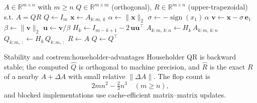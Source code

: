 \begin{algorithm}[H]
  \caption{QR Decomposition via Householder Reflections (full \(Q\))}
  \begin{algorithmic}[1]
    \Require $A \in \mathbb{R}^{m \times n}$ with $m \ge n$
    \Ensure $Q \in \mathbb{R}^{m \times m}$ (orthogonal), $R \in \mathbb{R}^{m \times n}$ (upper-trapezoidal) s.t. $A = QR$
    \State $Q \gets I_m$
      \State $\mathbf{x} \gets A_{k:m,\,k}$
        \State $\alpha \gets \|\mathbf{x}\|_2$
        \State $\sigma \gets -\operatorname{sign}(x_1)\,\alpha$ 
        \State $\mathbf{v} \gets \mathbf{x} - \sigma\,\mathbf{e}_1$
        \State $\beta \gets \|\mathbf{v}\|_2$
          \State $\mathbf{u} \gets \mathbf{v}/\beta$
          \State $H_k \gets I_{m-k+1} - 2\,\mathbf{u}\mathbf{u}^\top$ 
          \State $A_{k:m,\,k:n} \gets H_k\,A_{k:m,\,k:n}$
          \State $Q_{k:m,\,:} \gets H_k\,Q_{k:m,\,:}$
        \EndIf
      \EndIf
    \EndFor
    \State $R \gets A$ 
    \State $Q \gets Q^\top$ 
  \end{algorithmic}
\end{algorithm}

\begin{remark}{Stability and cost}{rem:householder-advantages}
    Householder QR is backward stable; the computed $\widehat{Q}$ is orthogonal to machine precision, and $\widehat{R}$ is the exact $R$ of a nearby $A+\Delta A$ with small relative $\|\Delta A\|$. The flop count is
    \[
        2mn^2 - \tfrac{2}{3}n^3\quad (m\ge n),
    \]
    and blocked implementations use cache-efficient matrix–matrix updates.
\end{remark}

